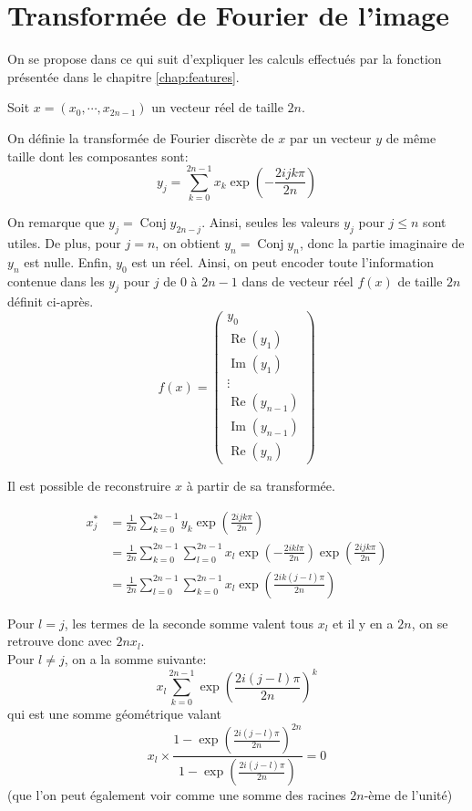 
\chapter{Transformée de Fourier de l'image}

On se propose dans ce qui suit d'expliquer les calculs effectués 
par la fonction  présentée dans le chapitre \ref{chap:features}.

\renewcommand{\Re}{\operatorname{Re}}
\renewcommand{\Im}{\operatorname{Im}}
\let\conjugatet\overline

Soit $x = (x_0, \cdots, x_{2n-1})$ un vecteur réel de taille $2n$.

On définie la transformée de Fourier discrète de $x$ par un vecteur 
$y$ de même taille dont les composantes sont:
\[
y_j = \sum_{k = 0}^{2n-1} x_k \exp\left(-\frac{2ijk\pi}{2n}\right)
\]

On remarque que $y_j = \operatorname{Conj} y_{2n-j}$. 
Ainsi, seules les valeurs $y_j$ pour $j \leq n$ sont utiles.
De plus, pour $j = n$, on obtient $y_n = \operatorname{Conj} y_{n}$, 
donc la partie imaginaire de $y_n$ est nulle.
Enfin, $y_0$ est un réel.
Ainsi, on peut encoder toute l'information contenue 
dans les $y_j$ pour $j$ de $0$ à $2n-1$ dans de vecteur réel 
$f(x)$ de taille $2n$ définit ci-après.
\[
f(x) = 
\begin{pmatrix}
  y_0 \\
  \Re(y_1) \\
  \Im(y_1) \\
  \vdots \\
  \Re(y_{n-1}) \\
  \Im(y_{n-1}) \\
  \Re(y_n)
\end{pmatrix}
\]

Il est possible de reconstruire $x$ à partir de sa transformée.

\begin{align*}
x^{*}_j &= \frac{1}{2n} \sum_{k=0}^{2n-1} y_k \exp\left( \frac{2ijk\pi}{2n} \right)  \\
        &= \frac{1}{2n} \sum_{k=0}^{2n-1} \sum_{l = 0}^{2n-1} x_l \exp\left(-\frac{2ikl\pi}{2n}\right) \exp\left( \frac{2ijk\pi}{2n} \right) \\
		&= \frac{1}{2n} \sum_{l=0}^{2n-1} \sum_{k = 0}^{2n-1} x_l \exp\left(\frac{2ik(j-l)\pi}{2n}\right) 
\end{align*}

Pour $l = j$, les termes de la seconde somme valent tous $x_l$ et il y en a 
$2n$, on se retrouve donc avec $2n x_l$. \\
Pour $l \neq j$, on a la somme suivante:
\[
x_l \sum_{k = 0}^{2n-1} \exp\left(\frac{2i(j-l)\pi}{2n}\right)^k 
\]
qui est une somme géométrique valant
\[
x_l \times \frac{1-\exp\left(\frac{2i(j-l)\pi}{2n}\right)^{2n}}{1-\exp\left(\frac{2i(j-l)\pi}{2n}\right)} = 0
\]
(que l'on peut également voir comme une somme des racines $2n$-ème de l'unité)

